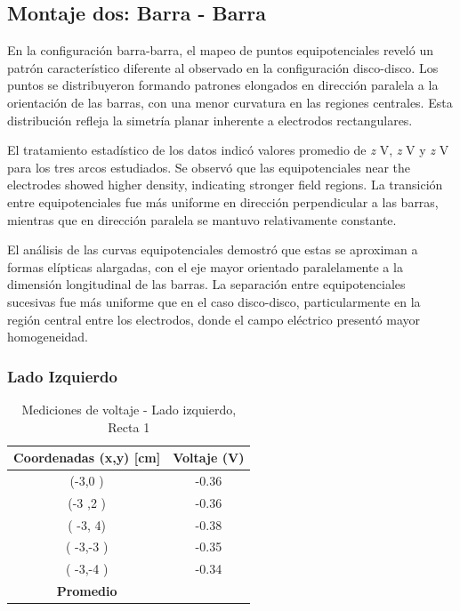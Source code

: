 \documentclass[11pt,twocolumn]{article}
\begin{document}
\subsection*{Montaje dos: Barra - Barra}

En la configuración barra-barra, el mapeo de puntos equipotenciales reveló un patrón característico diferente al observado en la configuración disco-disco. Los puntos se distribuyeron formando patrones elongados en dirección paralela a la orientación de las barras, con una menor curvatura en las regiones centrales. Esta distribución refleja la simetría planar inherente a electrodos rectangulares.

El tratamiento estadístico de los datos indicó valores promedio de \textit{z} V, \textit{z} V y \textit{z} V para los tres arcos estudiados. Se observó que las equipotenciales near the electrodes showed higher density, indicating stronger field regions. La transición entre equipotenciales fue más uniforme en dirección perpendicular a las barras, mientras que en dirección paralela se mantuvo relativamente constante.

El análisis de las curvas equipotenciales demostró que estas se aproximan a formas elípticas alargadas, con el eje mayor orientado paralelamente a la dimensión longitudinal de las barras. La separación entre equipotenciales sucesivas fue más uniforme que en el caso disco-disco, particularmente en la región central entre los electrodos, donde el campo eléctrico presentó mayor homogeneidad.

\subsubsection*{Lado Izquierdo}

\begin{table}[h]
\centering
\caption{Mediciones de voltaje - Lado izquierdo, Recta 1}
\begin{tabular}{cc}
\toprule
\textbf{Coordenadas (x,y) [cm]} & \textbf{Voltaje (V)} \\
\midrule
(-3,0 ) &  -0.36\\
(-3 ,2 ) &  -0.36\\
( -3, 4) &  -0.38\\
( -3,-3 ) &  -0.35\\
( -3,-4 ) & -0.34 \\
\midrule
\textbf{Promedio} &  \\
\bottomrule
\end{tabular}
\end{table}
\end{document}

